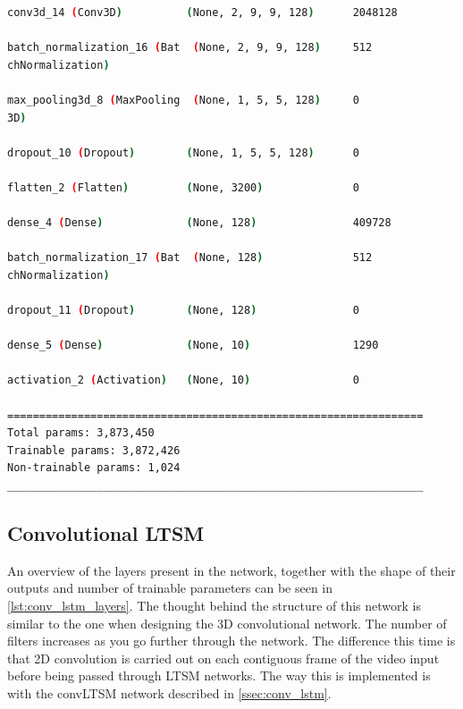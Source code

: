 \begin{lstlisting}[language=Bash,caption={Overview of layers in 3D convolutional network},label={lst:3d_conv_layers},numbers=none,float=htb]
conv3d_14 (Conv3D)          (None, 2, 9, 9, 128)      2048128   
                                                                
batch_normalization_16 (Bat  (None, 2, 9, 9, 128)     512       
chNormalization)                                                
                                                                
max_pooling3d_8 (MaxPooling  (None, 1, 5, 5, 128)     0         
3D)                                                             
                                                                
dropout_10 (Dropout)        (None, 1, 5, 5, 128)      0         
                                                                
flatten_2 (Flatten)         (None, 3200)              0         
                                                                
dense_4 (Dense)             (None, 128)               409728    
                                                                
batch_normalization_17 (Bat  (None, 128)              512       
chNormalization)                                                
                                                                
dropout_11 (Dropout)        (None, 128)               0         
                                                                
dense_5 (Dense)             (None, 10)                1290      
                                                                
activation_2 (Activation)   (None, 10)                0         
                                                                
=================================================================
Total params: 3,873,450
Trainable params: 3,872,426
Non-trainable params: 1,024
_________________________________________________________________
\end{lstlisting}

\subsection{Convolutional LTSM}

An overview of the layers present in the network, together with the shape of their outputs and number of trainable parameters can be seen in \cref{lst:conv_lstm_layers}. The thought behind the structure of this network is similar to the one when designing the 3D convolutional network. The number of filters increases as you go further through the network. The difference this time is that 2D convolution is carried out on each contiguous frame of the video input before being passed through LTSM networks. The way this is implemented is with the convLTSM network described in \cref{ssec:conv_lstm}.

